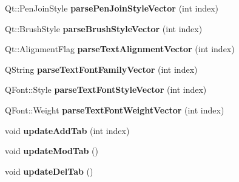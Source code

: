 \begin{DoxyCompactItemize}
\item 
\hypertarget{classMainWindow_a38917b3486064454ab944cd32ad9e66b}{Qt\-::\-Pen\-Join\-Style {\bfseries parse\-Pen\-Join\-Style\-Vector} (int index)}\label{classMainWindow_a38917b3486064454ab944cd32ad9e66b}

\item 
\hypertarget{classMainWindow_ac8e0cd00950e7163b76524b6f9a3143c}{Qt\-::\-Brush\-Style {\bfseries parse\-Brush\-Style\-Vector} (int index)}\label{classMainWindow_ac8e0cd00950e7163b76524b6f9a3143c}

\item 
\hypertarget{classMainWindow_a5db345978cde3e105ae8616d0eff3c63}{Qt\-::\-Alignment\-Flag {\bfseries parse\-Text\-Alignment\-Vector} (int index)}\label{classMainWindow_a5db345978cde3e105ae8616d0eff3c63}

\item 
\hypertarget{classMainWindow_a3d46a06b02546f2a84af06d98300e294}{Q\-String {\bfseries parse\-Text\-Font\-Family\-Vector} (int index)}\label{classMainWindow_a3d46a06b02546f2a84af06d98300e294}

\item 
\hypertarget{classMainWindow_a10dc30740db2bae9a78d72bcf4d92819}{Q\-Font\-::\-Style {\bfseries parse\-Text\-Font\-Style\-Vector} (int index)}\label{classMainWindow_a10dc30740db2bae9a78d72bcf4d92819}

\item 
\hypertarget{classMainWindow_a028a2c6adfb0f19a08cd082f15011c1b}{Q\-Font\-::\-Weight {\bfseries parse\-Text\-Font\-Weight\-Vector} (int index)}\label{classMainWindow_a028a2c6adfb0f19a08cd082f15011c1b}

\item 
\hypertarget{classMainWindow_a0f084030bc51307168626d47144cefc7}{void {\bfseries update\-Add\-Tab} (int index)}\label{classMainWindow_a0f084030bc51307168626d47144cefc7}

\item 
\hypertarget{classMainWindow_a9c5df82c43a4ef712a17e8f8503f2cc8}{void {\bfseries update\-Mod\-Tab} ()}\label{classMainWindow_a9c5df82c43a4ef712a17e8f8503f2cc8}

\item 
\hypertarget{classMainWindow_a3f7123f8adedad568d3c2fa77a7b9998}{void {\bfseries update\-Del\-Tab} ()}\label{classMainWindow_a3f7123f8adedad568d3c2fa77a7b9998}

\end{DoxyCompactItemize}
